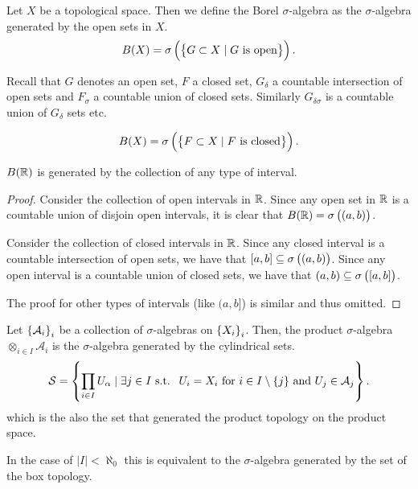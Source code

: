 \documentclass[11pt,a4paper]{article}
\newcommand{\A}{\mathcal A}
\begin{document}
\begin{definition}
  Let $X$ be a topological space.
  Then we define the Borel $\sigma$-algebra as the $\sigma$-algebra generated
  by the open sets in $X$.
  \[
    B(X) = \sigma\del{\set{G \subset X \mid G \text{ is open}}}.
  \]
\end{definition}
\begin{remark}
  Recall that $G$ denotes an open set, $F$ a closed set, $G_{\delta}$
  a countable intersection of open sets and $F_{\sigma}$ a countable
  union of closed sets.
  Similarly $G_{\delta \sigma}$ is a countable union of $G_{\delta}$ sets
  etc.
\end{remark}
\begin{remark}
  \[
    B(X) = \sigma\del{\set{F \subset X \mid F \text{ is closed}}}.
  \]
\end{remark}

\begin{proposition}
  $B(\mathbb{R})$ is generated by the collection of any type of interval.
\end{proposition}
\begin{proof}
  Consider the collection of open intervals in $\mathbb{R}$.
  Since any open set in $\mathbb{R}$ is a countable union of disjoin open intervals,
  it is clear that $B(\R) = \sigma\del{(a,b)}$.

  Consider the collection of closed intervals in $\mathbb{R}$.
  Since any closed interval is a countable intersection of open sets,
  we have that $[a,b] \subseteq \sigma\del{(a,b)}$.
  Since any open interval is a countable union of closed sets,
  we have that $(a,b) \subseteq \sigma\del{[a,b]}$.
  
  The proof for other types of intervals (like $(a,b]$) is similar and thus
  omitted.
\end{proof}

\begin{definition}
  Let $\set{\A_{i}}_{i}$ be a collection of $\sigma$-algebras on
  $\set{X_{i}}_{i}$.
  Then, the product $\sigma$-algebra $\otimes_{i \in I} \A_{i}$ is
  the $\sigma$-algebra generated by the cylindrical sets.
  \[
    \mathcal{S} = \set{\prod_{i \in I}{U_{\alpha}} \mid 
    \exists j \in I \st 
    \text{ $U_{i} = X_{i}$ 
    for $i \in I \setminus \{j\}$ and $U_j \in \A_j$}}.
  \]
  which is the also the set that generated the product topology on
  the product space.
\end{definition}
\begin{remark}
  In the case of $|I| < \aleph_0$ this is equivalent to the $\sigma$-algebra
  generated by the set of the box topology.
\end{remark}
\end{document}
